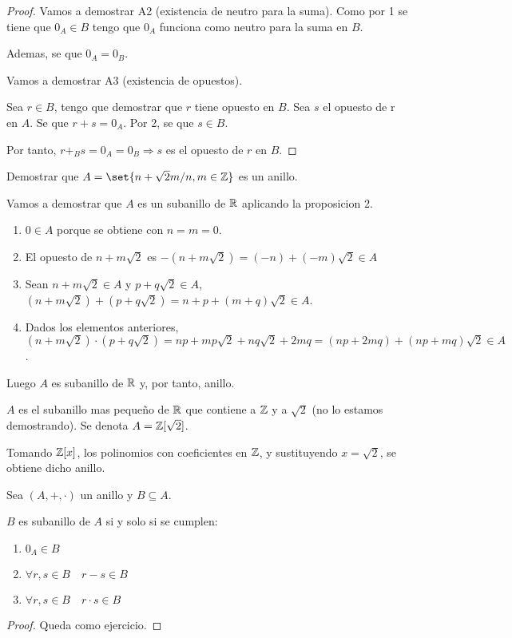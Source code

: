\begin{proof}
	Vamos a demostrar A2 (existencia de neutro para la suma). Como por 1 se tiene que \(0_A \in B \) tengo que \(0_A \) funciona como neutro para la suma en \(B \).
	
	Ademas, se que \(0_A = 0_B \).
	
	Vamos a demostrar A3 (existencia de opuestos).
	
	Sea \(r \in B \), tengo que demostrar que \(r \) tiene opuesto en \(B \). Sea \(s \) el opuesto de r en \(A \). Se que \(r + s = 0_A \). Por 2, se que \(s \in B \).
	
	Por tanto, \( r +_B s = 0_A = 0_B \Rightarrow s\) es el opuesto de \(r \) en \(B \).
\end{proof}

\begin{example}
	Demostrar que \(A = \set{n + \sqrt{2}m  / n,m \in \Z}\) es un anillo.
	
	Vamos a demostrar que \(A \) es un subanillo de \(\mathbb{R} \) aplicando la proposicion 2.
	
	\begin{enumerate}
		\item \(0 \in A \) porque se obtiene con \(n=m=0 \).
		\item El opuesto de \(n + m\sqrt{2} \) es \(-(n + m\sqrt{2}  ) = (-n) + (-m)\sqrt{2} \in A  \)
		\item Sean \(n + m\sqrt{2} \in A  \) y \(p + q \sqrt{2}  \in A \), \((n + m\sqrt{2} ) + (p + q \sqrt{2}   ) = n + p + (m + q)\sqrt{2} \in A \).
		\item Dados los elementos anteriores, \((n + m\sqrt{2} ) \cdot (p + q \sqrt{2} ) = np + mp\sqrt{2} + nq \sqrt{2} + 2mq = (np + 2mq) + (np+mq)\sqrt{2} \in A \).
	\end{enumerate}
	Luego \(A \) es subanillo de \(\mathbb{R} \) y, por tanto, anillo.
\end{example}

\begin{remark}
	\(A \) es el subanillo mas pequeño de \(\mathbb{R} \) que contiene a \(\mathbb{Z}\) y a \(\sqrt{2 } \) (no lo estamos demostrando). Se denota \(A = \mathbb{Z} [\sqrt{2} ]\).
	
	Tomando \(\mathbb{Z}[x ]\), los polinomios con coeficientes en \(\mathbb{Z} \), y sustituyendo \(x = \sqrt{2 } \), se obtiene dicho anillo.
\end{remark}

\begin{proposition}
	Sea \((A,+,\cdot )\) un anillo y \(B \subseteq A \).
	
	\(B \) es subanillo de \(A \) si y solo si se cumplen:
	\begin{enumerate}
		\item \(0_A \in B \)
		\item \(\forall r,s \in B \quad r-s \in B \)
		\item \(\forall r,s \in B \quad r \cdot s \in B \)
	\end{enumerate}
\end{proposition}
\begin{proof}
	Queda como ejercicio.
\end{proof}

